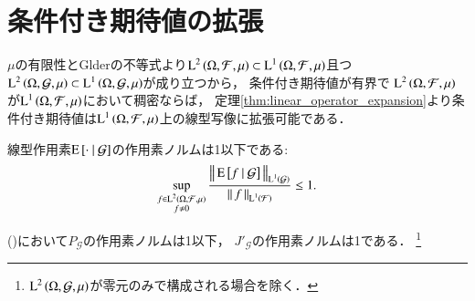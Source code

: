 	
\section{条件付き期待値の拡張}
	$\mu$の有限性とGlderの不等式より$\operatorname{L}^{2} \left(\Omega,\mathcal{F},\mu\right) \subset \operatorname{L}^{1} \left(\Omega,\mathcal{F},\mu\right)$且つ
	$\operatorname{L}^{2} \left(\Omega,\mathcal{G},\mu\right) \subset \operatorname{L}^{1} \left(\Omega,\mathcal{G},\mu\right)$が成り立つから，
	条件付き期待値が有界で
	$\operatorname{L}^{2} \left(\Omega,\mathcal{F},\mu\right)$が$\operatorname{L}^{1} \left(\Omega,\mathcal{F},\mu\right)$において稠密ならば，
	定理\ref{thm:linear_operator_expansion}より条件付き期待値は$\operatorname{L}^{1} \left(\Omega,\mathcal{F},\mu\right)$上の線型写像に拡張可能である．
	
	\begin{screen}
		\begin{lem}[条件付き期待値の有界性]
			線型作用素$\operatorname{E} \left[ \cdot \ \middle|\ \mathcal{G} \right]$の作用素ノルムは1以下である:
			\begin{align}
				\operatorname*{sup}_{\substack{f \in \operatorname{L}^{2} \left(\Omega,\mathcal{F},\mu\right) \\ f \neq 0}} \frac{ \left\|\, \operatorname{E} \left[ f \ \middle|\ \mathcal{G} \right]\, \right\|_{\operatorname{L}^{1} \left(\mathcal{G}\right)} }{ \left\|\, f\, \right\|_{\operatorname{L}^{1} \left(\mathcal{F}\right)} } \leq 1.
			\end{align}
			\label{lem:conditional_exp_bound}
		\end{lem}
	\end{screen}
	
	\begin{prf}
		()において$P_{\mathcal{G}}$の作用素ノルムは1以下，
		${J'_{\mathcal{G}}}$の作用素ノルムは1である．
		\footnote{
			$\operatorname{L}^{2} \left(\Omega,\mathcal{G},\mu\right)$が零元のみで構成される場合を除く．
		}
		\begin{comment}
			命題\ref{prp:L2_conditional_expectation}のC2より，任意の$0 \neq f \in \Lp{1}{\Omega,\mathcal{F},\mu}$に対して
			\begin{align}
				\Norm{\cexp{f}{\mathcal{G}}}{\Lp{1}{\mathcal{G}}} 
				&= \int_\Omega \left| \cexp{f}{\mathcal{G}}(x) \right|\ \mu(dx) \\
				&= \int_\Omega \cexp{f}{\mathcal{G}}(x) \defunc_{\left\{ \cexp{f}{\mathcal{G}} \geq 0\right \}}(x) 
					- \cexp{f}{\mathcal{G}}(x) \defunc_{\left\{ \cexp{f}{\mathcal{G}} < 0\right\} }(x)\ \mu(dx) \\
				&= \int_\Omega f(x) \defunc_{\left\{ \cexp{f}{\mathcal{G}} \geq 0\right\} }(x) - f(x) \defunc_{\left\{ \cexp{f}{\mathcal{G}} < 0\right\} }(x)\ \mu(dx) \\
				&\leq \int_\Omega |f(x)| \defunc_{\left\{ \cexp{f}{\mathcal{G}} \geq 0\right\} }(x) + |f(x)| \defunc_{\left\{ \cexp{f}{\mathcal{G}} < 0\right\} }(x)\ \mu(dx) \\
				&= \Norm{f}{\Lp{1}{\mathcal{F}}}.
			\end{align}
			が成り立つ．
		\end{comment}
		\QED
	\end{prf}
	
